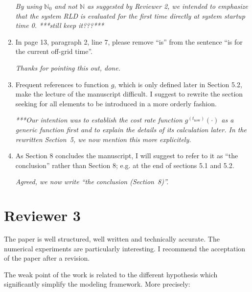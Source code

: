 \documentclass[authoryear]{elsarticle}
\newcommand{\naturals}{\mathbb{N}}
\def\tnow{t_\text{now}}
\begin{document}
\begin{enumerate}
\smallskip

\emph{By using $\naturals_0$ and not $\naturals$ as suggested by Reviewer 2,
we intended to emphasize that the system RLD is evaluated for the first time directly at system startup time 0.
***still keep it???***}

\item In page 13, paragraph 2, line 7, please remove “is” from the sentence “is for the current off-grid time”.

\smallskip

\emph{Thanks for pointing this out, done.}

\item Frequent references to function $g$, which is only defined later in Section 5.2, make the lecture of the manuscript difficult. I suggest to rewrite the section seeking for all elements to be introduced in a more orderly fashion.

\smallskip

\emph{***Our intention was to establish the cost rate function $g^{(\tnow)}(\cdot)$ as a generic function first
and to explain the details of its calculation later.
In the rewritten Section~5, we now mention this more explicitely.}

\item As Section 8 concludes the manuscript, I will suggest to refer to it as “the conclusion” rather than Section 8; e.g. at the end of sections 5.1 and 5.2.

\smallskip

\emph{Agreed, we now write ``the conclusion (Section~8)''.}
\end{enumerate}


\section*{Reviewer 3}

The paper is well structured, well written and technically accurate. The numerical experiments are particularly interesting. I recommend the acceptation of the paper after a revision. 

The weak point of the work is related to the different hypothesis which significantly simplify the modeling framework. More precisely:
\end{document}

